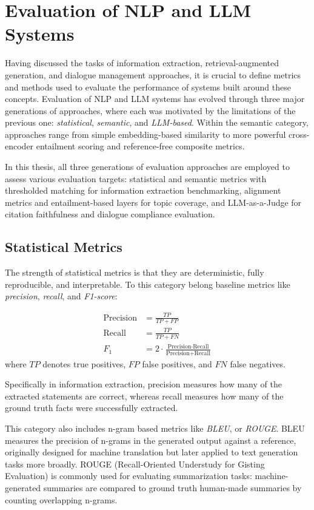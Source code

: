 \section{Evaluation of NLP and LLM Systems}

Having discussed the tasks of information extraction, retrieval-augmented generation, and dialogue management approaches, it is crucial to define metrics and methods used to evaluate the performance of systems built around these concepts.
Evaluation of NLP and LLM systems has evolved through three major generations of approaches, where each was motivated by the limitations of the previous one: \textit{statistical}, \textit{semantic}, and \textit{LLM-based}. 
Within the semantic category, approaches range from simple embedding-based similarity to more powerful cross-encoder entailment scoring and reference-free composite metrics. 

In this thesis, all three generations of evaluation approaches are employed to assess various evaluation targets: statistical and semantic metrics with thresholded matching for information extraction benchmarking, alignment metrics and entailment-based layers for topic coverage, and LLM-as-a-Judge for citation faithfulness and dialogue compliance evaluation.

\subsection{Statistical Metrics}

The strength of statistical metrics is that they are deterministic, fully reproducible, and interpretable. 
To this category belong baseline metrics like \textit{precision}, \textit{recall}, and \textit{F1-score}:

\begin{align}
\text{Precision} &= \frac{TP}{TP + FP} \\
\text{Recall}    &= \frac{TP}{TP + FN} \\
F_1              &= 2 \cdot \frac{\text{Precision} \cdot \text{Recall}}
                                 {\text{Precision} + \text{Recall}}
\end{align}
where $TP$ denotes true positives, $FP$ false positives, and $FN$ false negatives.

Specifically in information extraction, precision measures how many of the extracted statements are correct, whereas recall measures how many of the ground truth facts were successfully extracted.

This category also includes n-gram based metrics like \textit{BLEU}\cite{papineniBLEUMethodAutomatic2002}, or \textit{ROUGE}\cite{linROUGEPackageAutomatic2004}. 
BLEU measures the precision of n-grams in the generated output against a reference, originally designed for machine translation but later applied to text generation tasks more broadly. 
ROUGE (Recall-Oriented Understudy for Gisting Evaluation) is commonly used for evaluating summarization tasks: machine-generated summaries are compared to ground truth human-made summaries by counting overlapping n-grams.

